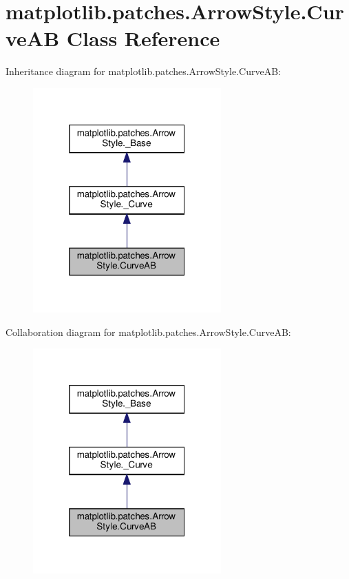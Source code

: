 \hypertarget{classmatplotlib_1_1patches_1_1ArrowStyle_1_1CurveAB}{}\section{matplotlib.\+patches.\+Arrow\+Style.\+Curve\+AB Class Reference}
\label{classmatplotlib_1_1patches_1_1ArrowStyle_1_1CurveAB}


Inheritance diagram for matplotlib.\+patches.\+Arrow\+Style.\+Curve\+AB\+:
\nopagebreak
\begin{figure}[H]
\begin{center}
\leavevmode
\includegraphics[width=205pt]{classmatplotlib_1_1patches_1_1ArrowStyle_1_1CurveAB__inherit__graph}
\end{center}
\end{figure}


Collaboration diagram for matplotlib.\+patches.\+Arrow\+Style.\+Curve\+AB\+:
\nopagebreak
\begin{figure}[H]
\begin{center}
\leavevmode
\includegraphics[width=205pt]{classmatplotlib_1_1patches_1_1ArrowStyle_1_1CurveAB__coll__graph}
\end{center}
\end{figure}
